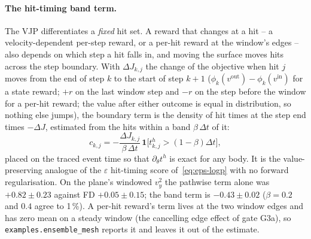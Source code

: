 \documentclass[11pt,a4paper]{article}
\numberwithin{equation}{section}
\newcommand{\ind}{\mathbf{1}}
\newcommand{\code}[1]{\texttt{#1}}
\begin{document}
\paragraph{The hit-timing band term.}
The VJP differentiates a \emph{fixed} hit set.  A reward that changes at a hit --
a velocity-dependent per-step reward, or a per-hit reward at the window's edges --
also depends on which step a hit falls in, and moving the surface moves hits across
the step boundary.  With $\Delta J_{k,j}$ the change of the objective when hit $j$
moves from the end of step $k$ to the start of step $k+1$
($\phi_k(v^{\mathrm{out}}) - \phi_k(v^{\mathrm{in}})$ for a state reward; $+r$ on the
last window step and $-r$ on the step before the window for a per-hit reward; the
value after either outcome is equal in distribution, so nothing else jumps), the
boundary term is the density of hit times at the step end times $-\Delta J$,
estimated from the hits within a band $\beta\,\Delta t$ of it:
\begin{equation}
\label{eq:timing}
c_{k,j} = -\frac{\Delta J_{k,j}}{\beta\,\Delta t}\,\ind\big[t^h_{k,j} > (1-\beta)\Delta t\big],
\end{equation}
placed on the traced event time so that $\partial_\theta t^h$ is exact for any body.
It is the value-preserving analogue of the $\varepsilon$ hit-timing score
of~\eqref{eq:eps-logp} with no forward regularisation.  On the plane's windowed $v_y^2$
the pathwise term alone was $+0.82 \pm 0.23$ against FD $+0.05 \pm 0.15$; the band term
is $-0.43 \pm 0.02$ ($\beta = 0.2$ and $0.4$ agree to 1\,\%).  A per-hit reward's term
lives at the two window edges and has zero mean on a steady window (the cancelling
edge effect of gate G3a), so \code{examples.ensemble\_mesh} reports it and leaves it
out of the estimate.
\end{document}
